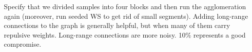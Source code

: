 

Specify that we divided samples into four blocks and then run the agglomeration again (moreover, run seeded WS to get rid of small segments).
Adding long-range connections to the graph is generally helpful, but when many of them carry repulsive weights. 
Long-range connections are more noisy. 10\% represents a good compromise.













